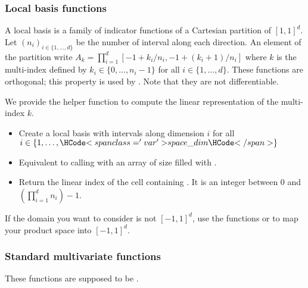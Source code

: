 \subsubsection{Local basis functions}

A local basis is a family of indicator functions of a Cartesian partition of ${[1,1]}^d$. Let $(n_i)_{i \in \{1, \dots, d\}}$ be the number of interval along each direction. An element of the partition write $A_k = \prod_{i=1}^d [-1 + k_i/n_i, -1 + (k_i + 1) / n_i]$ where $k$ is the multi-index defined by $k_i \in \{0, \dots, n_i - 1\}$ for all $i\in \{1,\dots, d\}$. These functions are orthogonal; this property is used by . Note that they are not differentiable.

We provide the helper function  to compute the linear representation of the multi-index $k$.

\begin{itemize}
  \item {}
  \sshortdescribe Create a local basis with  intervals along dimension $i$ for all $i \in \{1, \dots, \var{space\_dim}\}$
  \item {}
  \sshortdescribe Equivalent to calling  with an array of size  filled with .
  \item {}
  \sshortdescribe Return the linear index of the cell containing . It is an integer between $0$ and $(\prod_{i=1}^d n_i) - 1$.
\end{itemize}

If the domain you want to consider is not ${[-1,1]}^d$, use the functions  or  to map your product space into ${[-1,1]}^d$.

\subsubsection{Standard multivariate functions}

These functions are supposed to be .

